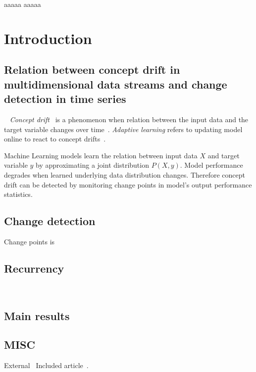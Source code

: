 \documentclass[licentiate,utf8,lot,loar,lof,shortloft,index]{jydiss}
\begin{document}
\preface
{} aaaaa
\acknowledgements
aaaaa

\mainmatter

\chapter{Introduction}
\section{Relation between concept drift in multidimensional data streams and change detection in time series}\
\textit{Concept drift}~\cite{schlimmer1986incremental,gama2014survey}  is a phenomenon when relation between the input data and the target variable changes over time~\cite{gama2014survey}.
\textit{Adaptive learning} refers to updating model online to react to concept drifts~\cite{gama2014survey}.

Machine Learning models learn the relation between input data $X$ and target variable $y$ by approximating a joint distribution $P(X,y)$. 
Model performance degrades when learned underlying data distribution changes.
Therefore concept drift can be detected by monitoring change points in model's output performance statistics.


\section{Change detection}
\begin{definition}
	Change points is
\end{definition}

\section{Recurrency}
~\cite{feller2008introduction}


\section{Main results}

\section{MISC}

External~\cite{shewhart1931economic}
Included article~\cite{sha1}.
\end{document}
